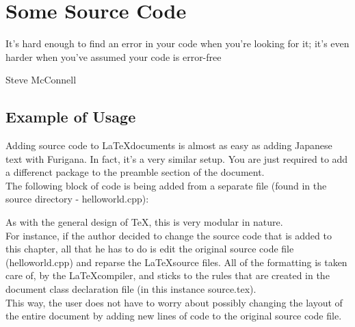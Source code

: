 \chapter{Some Source Code}
\epigraph{It's hard enough to find an error in your code when you're looking for it; it's even harder when you've assumed your code is error-free}{Steve McConnell}


\section{Example of Usage}
Adding source code to \LaTeX documents is almost as easy as adding Japanese text with Furigana. In fact, it's a very similar setup. You are just required to add a differenct package to the preamble section of the document.\\
\indent{}The following block of code is being added from a separate file (found in the source directory - helloworld.cpp):
\lstset{numbers=left, stepnumber=1, language=C++}

As with the general design of \TeX, this is very modular in nature.\\
\indent{}For instance, if the author decided to change the source code that is added to this chapter, all that he has to do is edit the original source code file (helloworld.cpp) and reparse the \LaTeX source files. All of the formatting is taken care of, by the \LaTeX compiler, and sticks to the rules that are created in the document class declaration file (in this instance source.tex).\\
\indent{}This way, the user does not have to worry about possibly changing the layout of the entire document by adding new lines of code to the original source code file.
